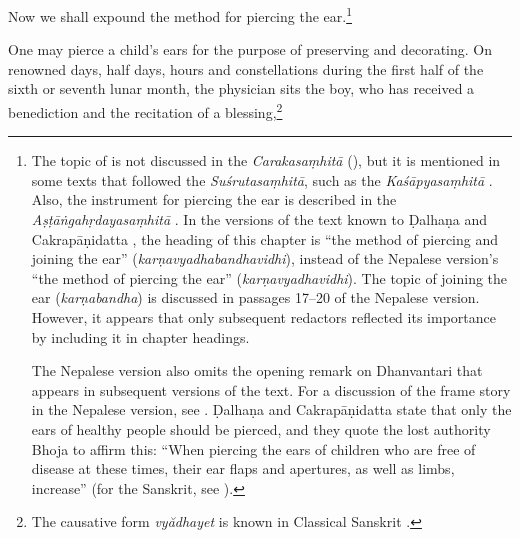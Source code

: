 \begin{translation}    
    
    
    \item [1] Now we shall expound the method for piercing the ear.\footnote{The
    topic of   is not discussed in the
    \emph{Carakasaṃhitā} (\cite[IB, 326, n.\,175]{meul-hist}), but it is mentioned
    in some texts that followed the \emph{Suśrutasaṃhitā}, such as the
    \emph{Kaśāpyasaṃhitā} \citep[IIA, 30]{meul-hist}. Also, the instrument for
    piercing the ear is described in the \emph{Aṣṭāṅgahṛdayasaṃhitā}
    . In the versions of the text known to Ḍalhaṇa
    \citep[76]{vulgate} and Cakrapāṇidatta \citep[125]{acar-1939}, the heading of
    this chapter is “the method of piercing and joining the ear”
    (\emph{karṇavyadhabandhavidhi}), instead of the Nepalese version's “the method
    of piercing the ear” (\emph{karṇavyadhavidhi}). The topic of joining the ear
    (\emph{karṇabandha}) is discussed in passages 17--20 of the Nepalese version.
    However, it appears that only subsequent redactors reflected its importance by
    including it in chapter headings.

 The Nepalese version also omits the opening remark on Dhanvantari that appears in
subsequent versions of the text. For a discussion of the frame story in the
Nepalese version, see \cite{birc-2021}. Ḍalhaṇa \citep[76]{vulgate} and
Cakrapāṇidatta \citep[125]{acar-1939} state that only the ears of healthy people
should be pierced, and they quote the lost authority Bhoja to affirm this: “When
piercing the ears of children who are free of disease at these times, their ear
flaps and apertures, as well as limbs, increase” (for the Sanskrit, see
\cite[76]{vulgate}).}

\item [2] One may pierce a child's ears for the purpose of preserving and
decorating. On renowned days, half days, hours and constellations during the first
half of the sixth or seventh lunar month, the physician sits the boy, who has
received a benediction and the recitation of a blessing,\footnote{The causative
    form \emph{vy\u adhayet} is known in Classical Sanskrit \citep[166]{whit-root}.

}
\end{translation}
